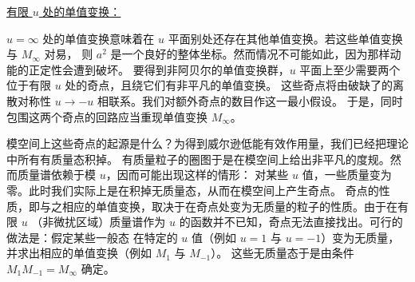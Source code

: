 
\noindent\underline{有限 $u$ 处的单值变换：}

$u=\infty$ 处的单值变换意味着在 $u$ 平面别处还存在其他单值变换。若这些单值变换与 $M_\infty$ 对易，
则 $a^2$ 是一个良好的整体坐标。然而情况不可能如此，因为那样动能的正定性会遭到破坏。
要得到非阿贝尔的单值变换群，$u$ 平面上至少需要两个位于有限 $u$ 处的奇点，且绕它们有非平凡的单值变换。
这些奇点将由破缺了的离散对称性 $u\rightarrow -u$ 相联系。我们对额外奇点的数目作这一最小假设。
于是，同时包围这两个奇点的回路应当重现单值变换 $M_\infty$。


模空间上这些奇点的起源是什么？为得到威尔逊低能有效作用量，我们已经把理论中所有有质量态积掉。
有质量粒子的圈图于是在模空间上给出非平凡的度规。然而质量谱依赖于模 $u$，因而可能出现这样的情形：
对某些 $u$ 值，一些质量变为零。此时我们实际上是在积掉无质量态，从而在模空间上产生奇点。
奇点的性质，即与之相应的单值变换，取决于在奇点处变为无质量的粒子的性质。由于在有限 $u$
（非微扰区域）质量谱作为 $u$ 的函数并不已知，奇点无法直接找出。可行的做法是：假定某些一般态
在特定的 $u$ 值（例如 $u=1$ 与 $u=-1$）变为无质量，并求出相应的单值变换（例如 $M_1$ 与 $M_{-1}$）。
这些无质量态于是由条件 $M_1 M_{-1}=M_\infty$ 确定。


